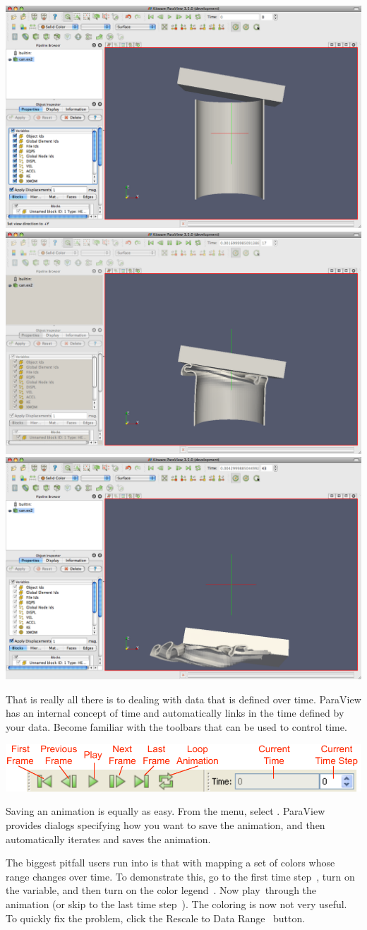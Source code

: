 \begin{inlinefig}
  \includegraphics[width=.32\linewidth]{images/AnimateCan1}
  \includegraphics[width=.32\linewidth]{images/AnimateCan2}
  \includegraphics[width=.32\linewidth]{images/AnimateCan3}
\end{inlinefig}

That is really all there is to dealing with data that is defined over time.
ParaView has an internal concept of time and automatically links in the
time defined by your data.  Become familiar with the toolbars that can be
used to control time.

\begin{inlinefig}
  \includegraphics[width=\linewidth]{images/AnimationToolbar}
\end{inlinefig}

Saving an animation is equally as easy.  From the menu, select 
\ra {}.  ParaView provides dialogs specifying how you
want to save the animation, and then automatically iterates and saves the
animation.

The biggest pitfall users run into is that with mapping a set of colors
whose range changes over time.  To demonstrate this, go to the first time
step~\vcrFirst, turn on the  variable, and then turn on the color
legend~.  Now play~\vcrPlay through the animation (or
skip to the last time step~\vcrLast).  The coloring is now not very useful.
To quickly fix the problem, click the Rescale to Data
Range~ button.

